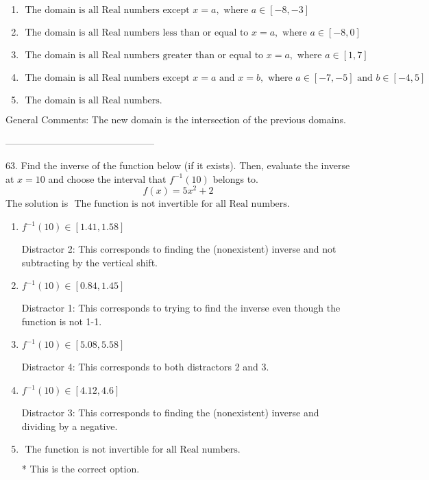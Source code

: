 \documentclass{extbook}[14pt]
\begin{document}
\begin{enumerate}[label=\Alph*.] 
\item $ \text{ The domain is all Real numbers except } x = a, \text{ where } a \in [-8, -3] $ 

  
\item $ \text{ The domain is all Real numbers less than or equal to } x = a, \text{ where } a \in [-8, 0] $ 

  
\item $ \text{ The domain is all Real numbers greater than or equal to } x = a, \text{ where } a \in [1, 7] $ 

  
\item $ \text{ The domain is all Real numbers except } x = a \text{ and } x = b, \text{ where } a \in [-7, -5] \text{ and } b \in [-4, 5] $ 

  
\item $ \text{ The domain is all Real numbers. } $ 

  
\end{enumerate} 
 
General Comments: The new domain is the intersection of the previous domains.

-----------------------------------------------

63. Find the inverse of the function below (if it exists). Then, evaluate the inverse at $x = 10$ and choose the interval that $f^{-1}(10)$ belongs to.
\[ f(x) = 5 x^2 + 2 \] 
The solution is $ \text{ The function is not invertible for all Real numbers. } $ 

\begin{enumerate}[label=\Alph*.] 
\item $ f^{-1}(10) \in [1.41, 1.58] $ 

  Distractor 2: This corresponds to finding the (nonexistent) inverse and not subtracting by the vertical shift. 
\item $ f^{-1}(10) \in [0.84, 1.45] $ 

  Distractor 1: This corresponds to trying to find the inverse even though the function is not 1-1.  
\item $ f^{-1}(10) \in [5.08, 5.58] $ 

  Distractor 4: This corresponds to both distractors 2 and 3. 
\item $ f^{-1}(10) \in [4.12, 4.6] $ 

  Distractor 3: This corresponds to finding the (nonexistent) inverse and dividing by a negative. 
\item $ \text{ The function is not invertible for all Real numbers. } $ 

 * This is the correct option. 
\end{enumerate} 
 
\end{document}
